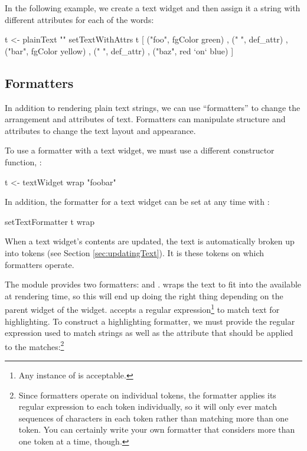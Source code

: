 In the following example, we create a text widget and then assign it a
string with different attributes for each of the words:

\begin{haskellcode}
 t <- plainText ""
 setTextWithAttrs t [ ("foo", fgColor green)
                    , (" ", def_attr)
                    , ("bar", fgColor yellow)
                    , (" ", def_attr)
                    , ("baz", red `on` blue)
                    ]
\end{haskellcode}

\subsection{Formatters}

In addition to rendering plain text strings, we can use ``formatters''
to change the arrangement and attributes of text.  Formatters can
manipulate structure and attributes to change the text layout and
appearance.

To use a formatter with a text widget, we must use a different
constructor function, :

\begin{haskellcode}
 t <- textWidget wrap "foobar"
\end{haskellcode}

In addition, the formatter for a text widget can be set at any time
with :

\begin{haskellcode}
 setTextFormatter t wrap
\end{haskellcode}

When a text widget's contents are updated, the text is automatically
broken up into tokens (see Section \ref{sec:updatingText}).  It is
these tokens on which formatters operate.

The  module provides two formatters:  and
.   wraps the text to fit into the
 available at rendering time, so this will end up
doing the right thing depending on the parent widget of the
 widget.   accepts a regular
expression\footnote{Any instance of  is acceptable.} to
match text for highlighting.  To construct a highlighting formatter,
we must provide the regular expression used to match strings as well
as the attribute that should be applied to the matches:\footnote{Since
  formatters operate on individual tokens, the 
  formatter applies its regular expression to each token individually,
  so it will only ever match sequences of characters in each token
  rather than matching more than one token.  You can certainly write
  your own formatter that considers more than one token at a time,
  though.}

